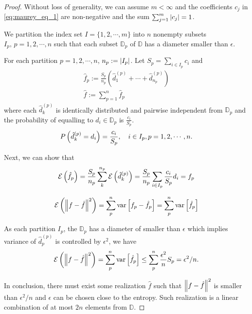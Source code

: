 \begin{proof}
    Without loss of generality, we can assume $m < \infty$ and the coefficients
    $c_j$ in \eqref{eq:maurey_eq_1} are non-negative and the sum $\sum_{j=1}^m
    \left| c_j \right| = 1$.

    We partition the index set $I = \{1,2,\cdots,m\}$ into $n$ nonempty subsets
    $I_p, \,p=1,2,\cdots,n$ such that each subset $\mathbb{D}_p$ of $\mathbb{D}$
    has a diameter smaller than $\epsilon$.

    For each partition $p = 1, 2,\cdots, n$, $n_p := \left| I_p \right|$. Let $S_p = \sum_{i\in I_p} c_i$
    and 
    \begin{align}
        \hat{f}_p := \frac{S_p}{n_p} (\hat{d}_1^{(p)} + \cdots + \hat{d}_{n_p}^{(p)}) \\
        \hat{f} := \sum_{p=1}^n \hat{f}_p
    \end{align}
    where each $\hat{d}_{k}^{(p)}$ is identically distributed and pairwise
    independent from $\mathbb{D}_p$ and the probability of equalling to $d_i \in
    \mathbb{D}_p$ is $\frac{c_i}{S_p}$.
    \begin{equation}
        \PR{\hat{d}_{k}^{(p)} = d_i} = \frac{c_i}{S_p}, 
        \quad i \in I_p, p = 1,2,\cdots, n.
    \end{equation}

    Next, we can show that 
    \begin{equation}
        \ERW{\hat{f}_p} = \frac{S_p}{n_p} \sum_{k}^{n_p}\ERW{\hat{d}_{k}^{(p)}}
        = \frac{S_p}{n_p} \sum_{i\in I_p} \frac{c_i}{S_p} d_i = f_p
    \end{equation}

    \begin{equation}
        \ERW{\norm{f - \hat{f}}^2} = \sum^n_p \VAR{f_p - \hat{f}_p} = \sum^n_p \VAR{\hat{f}_p}
    \end{equation}

    As each partition $I_p$, the $\mathbb{D}_p$ has a diameter of smaller than
    $\epsilon$ which implies variance of $\hat{d}_p^{(p)}$ is controlled by
    $\epsilon^2$, we have
    \begin{equation}
        \ERW{\norm{f - \hat{f}}^2} =\sum^n_p \VAR{\hat{f}_p} \leq \sum^n_p \frac{\epsilon^2}{n} S_p = \epsilon^2/n.
    \end{equation}

    In conclusion, there must exist some realization $\hat{f}$ such that
    $\left\| f-\hat{f} \right\|^2$ is smaller than $\epsilon^2/n$ and $\epsilon$ can be
    chosen close to the entropy. Such realization is a linear combination of at
    most $2n$ elements from $\mathbb{D}$.
\end{proof}

